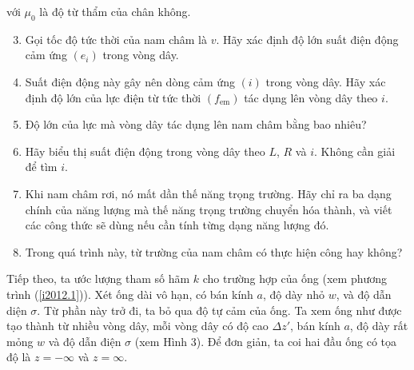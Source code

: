 \begin{vd}
với $\mu_0$ là độ từ thẩm của chân không.
\begin{enumerate}[1)]
\setcounter{enumi}{2}
    \item Gọi tốc độ tức thời của nam châm là $v$. Hãy xác định độ lớn suất điện động cảm ứng $(e_{i})$ trong vòng dây.
    \item Suất điện động này gây nên dòng cảm ứng $(i)$ trong vòng dây. Hãy xác định độ lớn của lực điện từ tức thời $(f_{\text{em}})$ tác dụng lên vòng dây theo $i$.
    \item Độ lớn của lực mà vòng dây tác dụng lên nam châm bằng bao nhiêu?
    \item Hãy biểu thị suất điện động trong vòng dây theo $L$, $R$ và $i$. Không cần giải để tìm $i$.
    \item Khi nam châm rơi, nó mất dần thế năng trọng trường. Hãy chỉ ra ba dạng chính của năng lượng mà thế năng trọng trường chuyển hóa thành, và viết các công thức sẽ dùng nếu cần tính từng dạng năng lượng đó. 
    \item Trong quá trình này, từ trường của nam châm có thực hiện công hay không?
\end{enumerate}
Tiếp theo, ta ước lượng tham số hãm $k$ cho trường hợp của
ống (xem phương trình (\ref{i2012.1})). Xét ống dài vô hạn, có bán kính $a$, độ dày nhỏ $w$, và độ dẫn diện $\sigma$. Từ phần này trở đi, ta bỏ qua độ tự cảm của ống. Ta xem ống như được tạo thành từ nhiều vòng dây, mỗi vòng dây có độ cao $\Delta z'$, bán kính $a$, độ dày rất mỏng $w$ và độ dẫn điện $\sigma$ (xem Hình $3$). Để đơn giản, ta coi hai đầu ống có tọa độ là $z=-\infty$ và $z=\infty$.
\begin{center}



\begin{tikzpicture}[x=0.75pt,y=0.75pt,yscale=-1,xscale=1]


\end{tikzpicture}
\end{center}
\end{vd}
